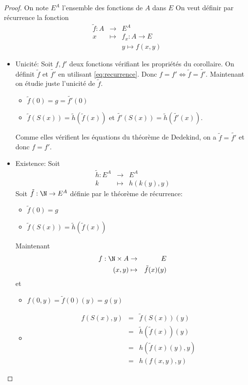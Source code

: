 \begin{proof}
	On note $E^A$ l'ensemble des fonctions de $A$ dans $E$
	On veut définir par récurrence la fonction
	\begin{eqnarray} \label{eq:recurrence}
		\tilde{f} : A & \to     & E^A   \\
		x             & \mapsto & f_x : A \to E    \nonumber \\
		&         & y \mapsto f(x,y) \nonumber
	\end{eqnarray}
	\begin{itemize}
		\item Unicité: Soit $f,f'$ deux fonctions vérifiant les propriétés du corollaire. On définit $\tilde{f}$ et $\tilde{f'}$ en utilisant \ref{eq:recurrence}.
		      Donc $f = f' \iff \tilde{f} = \tilde{f'}$.
		      Maintenant on étudie juste l'unicité de $\tilde{f}$.
		      \begin{itemize}
			      \item  $ \tilde{f}(0) = g = \tilde{f'}(0)$
			      \item $ \tilde{f}(S(x)) = \tilde{h}(\tilde{f}(x))$ et $ \tilde{f'}(S(x)) = \tilde{h}(\tilde{f'}(x))$.
		      \end{itemize}
		      Comme elles vérifient les équations du théorème de Dedekind, on a $\tilde{f} = \tilde{f'}$ et donc $f = f'$.
		\item Existence: Soit \begin{eqnarray*}
			      \tilde{h}: E^A & \to & E^A \\
			      k & \mapsto & h(k(y),y)
		      \end{eqnarray*}
		      Soit $\tilde{f} : \N \to E^A$ définie par le théorème de récurrence:
		      \begin{itemize}
			      \item $\tilde{f}(0) = g$
			      \item $\tilde{f}(S(x)) = \tilde{h}(\tilde{f}(x))$
		      \end{itemize}
		      Maintenant \begin{eqnarray*}
			      f : \N \times A & \to & E \\
			      (x,y) & \mapsto & \tilde{f}(x)(y)
		      \end{eqnarray*}
		      et \begin{itemize}
			      \item $f(0,y) = \tilde{f}(0)(y) = g(y)$
			      \item \begin{eqnarray*}
				            f(S(x),y) & = & \tilde{f}(S(x))(y) \\
				            & = & \tilde{h}(\tilde{f}(x))(y) \\
				            & = & h(\tilde{f}(x)(y),y) \\
				            & = & h(f(x,y),y)
			            \end{eqnarray*}
		      \end{itemize}
	\end{itemize}
\end{proof}


